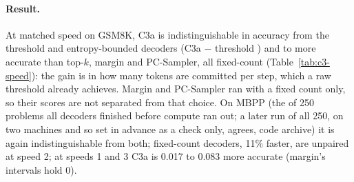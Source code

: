 \paragraph{Result.}
At matched speed on GSM8K, C3a is indistinguishable in accuracy from the threshold and
entropy-bounded decoders (C3a $-$ threshold )
and  to 
more accurate than top-$k$, margin and PC-Sampler, all fixed-count (Table~\ref{tab:c3-speed}): the gain is in how
many tokens are committed per step, which a raw threshold already achieves. Margin and PC-Sampler
ran with a fixed count only, so their scores are not separated from that choice.
On MBPP (the  of 250 problems all decoders finished before compute ran
out; a later run of all 250, on two machines and so set in advance as a check only, agrees,
code archive) it is again indistinguishable from
both; fixed-count decoders, 11\% faster, are unpaired at speed 2; at speeds 1 and 3 C3a is
0.017 to 0.083 more accurate (margin's intervals hold 0).

